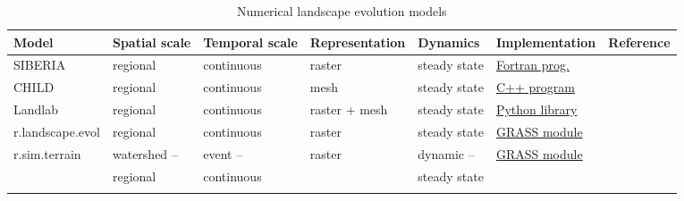 \documentclass[esurf, manuscript]{copernicus}
\begin{document}
\begin{table}
\small
\caption{Numerical landscape evolution models}
\begin{tabu} to \textwidth {XXXXXll}
\toprule
Model & Spatial scale &  Temporal scale & Representation & Dynamics & Implementation & Reference\\
\midrule
SIBERIA & regional & continuous & raster & steady state & \href{https://csdms.colorado.edu/wiki/Model:SIBERIA}{Fortran prog.} & \citep{Willgoose2005}\\
CHILD & regional & continuous & mesh & steady state & \href{https://csdms.colorado.edu/wiki/Model:CHILD}{C++ program} & \citep{Tucker2001}\\
Landlab & regional & continuous & raster + mesh & steady state & \href{https://github.com/landlab/}{Python library} & \citep{Hobley2017}\\
r.landscape.evol  & regional & continuous & raster &  steady state & \href{https://grass.osgeo.org/grass74/manuals/addons/r.landscape.evol.html}{GRASS module} & \citep{Barton2010}\\
r.sim.terrain & watershed -- & event -- & raster & dynamic -- & \href{https://github.com/baharmon/landscape_evolution}{GRASS module} &\\ %
& regional & continuous && steady state & &\\
\bottomrule
\\
\end{tabu}
\label{table:evolution_models} 
\end{table}

\end{document}
